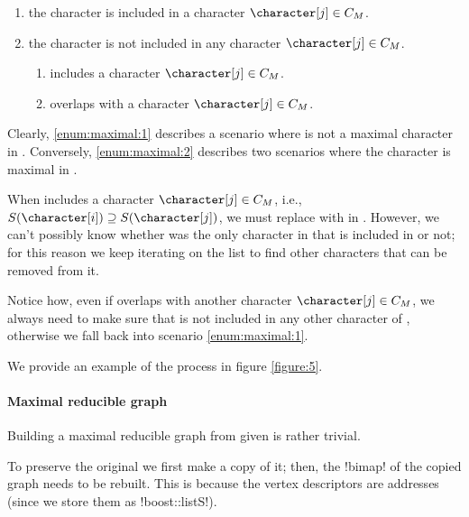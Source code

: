\begin{enumerate}[label=\textbf{S.\arabic*}, ref=S.\arabic*]
  \item \label{enum:maximal:1} the character \character[i] is included in a character $\character[j] \in \cm{}$.

  \item \label{enum:maximal:2} the character \character[i] is not included in any character $\character[j] \in \cm{}$.
  \begin{enumerate}
    \item \label{enum:maximal:2:b} \character[i] includes a character $\character[j] \in \cm{}$.

    \item \label{enum:maximal:2:a} \character[i] overlaps with a character $\character[j] \in \cm{}$.
  \end{enumerate}
\end{enumerate}

Clearly, \ref{enum:maximal:1} describes a scenario where \character[i] is not a maximal character in \grb{}.
Conversely, \ref{enum:maximal:2} describes two scenarios where the character \character[i] is maximal in \grb{}.

When \character[i] includes a character $\character[j] \in \cm{}$, i.e., $S(\character[i]) \supseteq S(\character[j])$, we must replace \character[j] with \character[i] in \cm{}.
However, we can't possibly know whether \character[j] was the only character in \cm{} that is included in \character[i] or not; for this reason we keep iterating on the list \cm{} to find other characters that can be removed from it.

Notice how, even if \character[i] overlaps with another character $\character[j] \in \cm{}$, we always need to make sure that \character[i] is not included in any other character of \cm{}, otherwise we fall back into scenario \ref{enum:maximal:1}.

We provide an example of the process in figure \ref{figure:5}.

\paragraph{Maximal reducible graph}

Building a maximal reducible graph \grbcm{} from \grb{} given \cm{} is rather trivial.

To preserve the original \grb{} we first make a copy of it; then, the !bimap! of the copied graph needs to be rebuilt.
This is because the vertex descriptors are addresses (since we store them as !boost::listS!).

